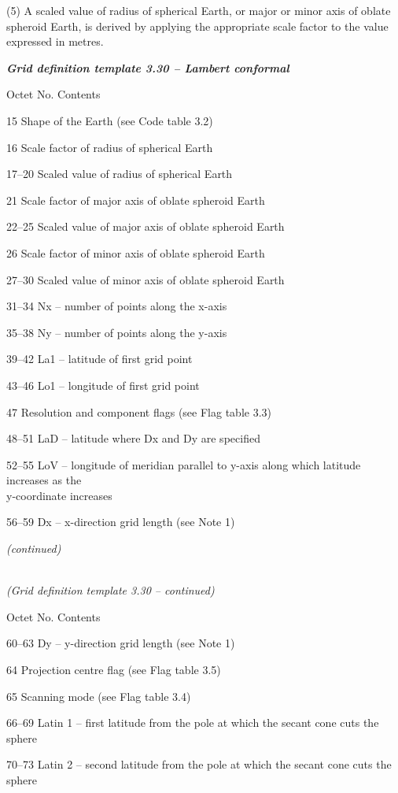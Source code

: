 (5) A scaled value of radius of spherical Earth, or major or minor axis of oblate spheroid Earth, is derived by applying the appropriate scale factor to the value expressed in metres.

\emph{\textbf{Grid definition template 3.30 -- Lambert conformal}}

Octet No. Contents

15 Shape of the Earth (see Code table 3.2)

16 Scale factor of radius of spherical Earth

17--20 Scaled value of radius of spherical Earth

21 Scale factor of major axis of oblate spheroid Earth

22--25 Scaled value of major axis of oblate spheroid Earth

26 Scale factor of minor axis of oblate spheroid Earth

27--30 Scaled value of minor axis of oblate spheroid Earth

31--34 Nx -- number of points along the x-axis

35--38 Ny -- number of points along the y-axis

39--42 La1 -- latitude of first grid point

43--46 Lo1 -- longitude of first grid point

47 Resolution and component flags (see Flag table 3.3)

48--51 LaD -- latitude where Dx and Dy are specified

52--55 LoV -- longitude of meridian parallel to y-axis along which latitude increases as the\\
y-coordinate increases

56--59 Dx -- x-direction grid length (see Note 1)

\emph{(continued)}

\emph{\\
(Grid definition template 3.30 -- continued)}

Octet No. Contents

60--63 Dy -- y-direction grid length (see Note 1)

64 Projection centre flag (see Flag table 3.5)

65 Scanning mode (see Flag table 3.4)

66--69 Latin 1 -- first latitude from the pole at which the secant cone cuts the sphere

70--73 Latin 2 -- second latitude from the pole at which the secant cone cuts the sphere

